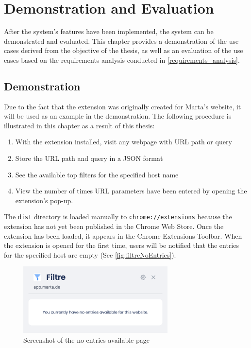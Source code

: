 \newpage
\chapter{Demonstration and Evaluation}
After the system's features have been implemented, the system can be demonstrated and evaluated. This chapter provides a demonstration of the use cases derived from the objective of the thesis, as well as an evaluation of the use cases based on the requirements analysis conducted in \autoref{requirements_analysis}.

\section{Demonstration}
Due to the fact that the extension was originally created for Marta's website, it will be used as an example in the demonstration. The following procedure is illustrated in this chapter as a result of this thesis:

\begin{enumerate}
  \item With the extension installed, visit any webpage with URL path or query
  \item Store the URL path and query in a JSON format
  \item See the available top filters for the specified host name
  \item View the number of times URL parameters have been entered by opening the extension's pop-up.
\end{enumerate}

The \texttt{dist} directory is loaded manually to \verb;chrome://extensions; because the extension has not yet been published in the Chrome Web Store. Once the extension has been loaded, it appears in the Chrome Extensions Toolbar. When the extension is opened for the first time, users will be notified that the entries for the specified host are empty (See \autoref{fig:filtreNoEntries}).

\begin{figure}[H]
  \centering
  \includegraphics[width=0.7\textwidth]{assets/screenshot_filtre_no_entries.png}
  \caption{Screenshot of the no entries available page}
  \label{fig:filtreNoEntries}
\end{figure}

